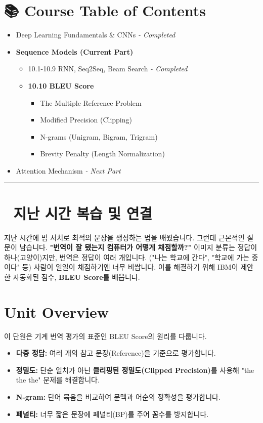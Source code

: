 \documentclass[11pt,a4paper]{book}
\theoremstyle{definition}
\begin{document}
\section*{📚 Course Table of Contents}
\begin{itemize}
    \item[Chapter 1-9.] Deep Learning Fundamentals \& CNNs \textit{- Completed}
    \item[\textbf{Chapter 10.}] \textbf{Sequence Models (Current Part)}
    \begin{itemize}
        \item 10.1-10.9 RNN, Seq2Seq, Beam Search \textit{- Completed}
        \item \textbf{10.10 BLEU Score}
        \begin{itemize}
            \item The Multiple Reference Problem
            \item Modified Precision (Clipping)
            \item N-grams (Unigram, Bigram, Trigram)
            \item Brevity Penalty (Length Normalization)
        \end{itemize}
    \end{itemize}
    \item[Chapter 11.] Attention Mechanism \textit{- Next Part}
\end{itemize}

\vspace{0.5cm}
\hrule
\vspace{0.5cm}

\section*{🔗 지난 시간 복습 및 연결}
지난 시간에 빔 서치로 최적의 문장을 생성하는 법을 배웠습니다. 그런데 근본적인 질문이 남습니다.
\textbf{"번역이 잘 됐는지 컴퓨터가 어떻게 채점할까?"}
이미지 분류는 정답이 하나(고양이)지만, 번역은 정답이 여러 개입니다. ("나는 학교에 간다", "학교에 가는 중이다" 등)
사람이 일일이 채점하기엔 너무 비쌉니다. 이를 해결하기 위해 IBM이 제안한 자동화된 점수, \textbf{BLEU Score}를 배웁니다.

\section{Unit Overview}
\begin{summarybox}[title={핵심 목표}]
이 단원은 기계 번역 평가의 표준인 BLEU Score의 원리를 다룹니다.
\begin{itemize}
    \item \textbf{다중 정답:} 여러 개의 참고 문장(Reference)을 기준으로 평가합니다.
    \item \textbf{정밀도:} 단순 일치가 아닌 \textbf{클리핑된 정밀도(Clipped Precision)}를 사용해 "the the the" 문제를 해결합니다.
    \item \textbf{N-gram:} 단어 묶음을 비교하여 문맥과 어순의 정확성을 평가합니다.
    \item \textbf{페널티:} 너무 짧은 문장에 페널티(BP)를 주어 꼼수를 방지합니다.
\end{itemize}
\end{summarybox}
\end{document}
